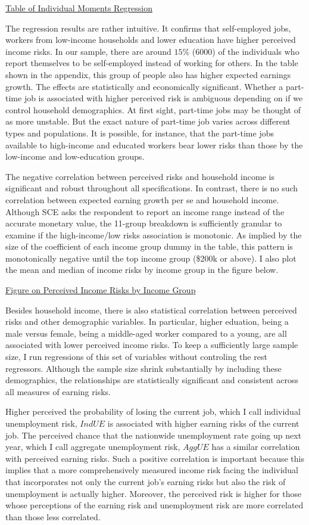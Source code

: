 \documentclass[12pt,notitlepage,onecolumn,aps,pra]{revtex4-1}
\begin{document}
\href{../Table/mom_ind_reg.cvs}{Table of Individual Moments Regression}

The regression results are rather intuitive. It confirms that
self-employed jobs, workers from low-income households and lower
education have higher perceived income risks. In our sample, there are
around \(15\%\) (6000) of the individuals who report themselves to be
self-employed instead of working for others. In the table shown in the
appendix, this group of people also has higher expected earnings growth.
The effects are statistically and economically significant. Whether a
part-time job is associated with higher perceived risk is ambiguous
depending on if we control household demographics. At first sight,
part-time jobs may be thought of as more unstable. But the exact nature
of part-time job varies across different types and populations. It is
possible, for instance, that the part-time jobs available to high-income
and educated workers bear lower risks than those by the low-income and
low-education groups.

The negative correlation between perceived risks and household income is
significant and robust throughout all specifications. In contrast, there
is no such correlation between expected earning growth per se and
household income. Although SCE asks the respondent to report an income
range instead of the accurate monetary value, the 11-group breakdown is
sufficiently granular to examine if the high-income/low risks
association is monotonic. As implied by the size of the coefficient of
each income group dummy in the table, this pattern is monotonically
negative until the top income group (\$200k or above). I also plot the
mean and median of income risks by income group in the figure below.

\href{'../Graphs/ind/riskbyincome.jpg'}{Figure on Perceived Income Risks
by Income Group}

Besides household income, there is also statistical correlation between
perceived risks and other demographic variables. In particular, higher
eduation, being a male versus female, being a middle-aged worker
compared to a young, are all associated with lower perceived income
risks. To keep a sufficiently large sample size, I run regressions of
this set of variables without controling the rest regressors. Although
the sample size shrink substantially by including these demographics,
the relationships are statistically significant and consistent across
all measures of earning risks.

Higher perceived the probability of losing the current job, which I call
individual unemployment risk, \(\textit{IndUE}\) is associated with
higher earning risks of the current job. The perceived chance that the
nationwide unemployment rate going up next year, which I call aggregate
unemployment risk, \(\textit{AggUE}\) has a similar correlation with
perceived earning risks. Such a positive correlation is important
because this implies that a more comprehensively measured income risk
facing the individual that incorporates not only the current job's
earning risks but also the risk of unemployment is actually higher.
Moreover, the perceived risk is higher for those whose perceptions of
the earning risk and unemployment risk are more correlated than those
less correlated.
\end{document}
